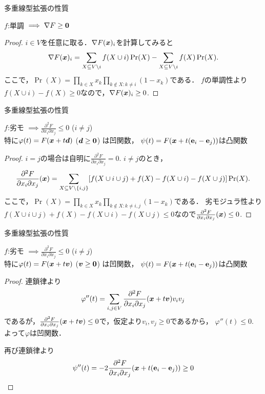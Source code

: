 \documentclass[14pt,aspectratio=169,xcolor=dvipsnames,table,onlytextwidth,dvipdfmx]{beamer}
\begin{document}
\begin{frame}[t]{多重線型拡張の性質}
    \small
    \begin{lemma}
        $f$:単調 $\implies \nabla F \geq \mathbf{0}$
    \end{lemma}
    \begin{proof}
        $i \in V$を任意に取る．$\nabla F(\boldsymbol{x})_i$を計算してみると
        \[
            \nabla F(\boldsymbol{x})_i = \sum_{X \subseteq V \setminus i} f(X \cup i)\Pr(X) - \sum_{X \subseteq V \setminus i} f(X)\Pr(X).
        \]
        ここで，$\Pr(X) = \prod_{k \in X}x_k \prod_{k \notin X: k \neq i} (1 - x_k)$である．
        $f$の単調性より$f(X \cup i) - f(X) \geq 0$なので，$\nabla F(\boldsymbol{x})_i \geq 0$.
    \end{proof}
\end{frame}

\begin{frame}[t]{多重線型拡張の性質}
    \small
    \begin{lemma}
        $f$:劣モ $\implies \frac{\partial^2 F}{\partial x_i \partial x_j} \leq 0$ ($i \neq j$) \\
        特に$\varphi(t) = F(\boldsymbol{x} + t \boldsymbol{d})$ ($\boldsymbol{d}\geq \mathbf{0}$) は凹関数，
        $\psi(t) = F(\boldsymbol{x} + t(\mathbf{e}_i - \mathbf{e}_j))$は凸関数
    \end{lemma}
    \begin{proof}
        $i = j$の場合は自明に$\frac{\partial^2 F}{\partial x_i \partial x_j} = 0$. $i\neq j$のとき，
        \[
            \frac{\partial^2 F}{\partial x_i \partial x_j}(\boldsymbol{x}) =
            \sum_{X \subseteq V\setminus\{i, j\}}
            [f(X \cup i \cup j) + f(X) - f(X \cup i) - f(X \cup j)]\Pr(X).
        \]
        ここで，$\Pr(X) = \prod_{k \in X}x_k \prod_{k \notin X: k \neq i, j} (1 - x_k)$である．
        劣モジュラ性より$f(X \cup i \cup j) + f(X) - f(X \cup i) - f(X \cup j) \leq 0$なので$\frac{\partial^2 F}{\partial x_i \partial x_j}(\boldsymbol{x})\leq 0$.
    \end{proof}
\end{frame}

\begin{frame}[t]{多重線型拡張の性質}
    \small
    \begin{lemma}
        $f$:劣モ $\implies \frac{\partial^2 F}{\partial x_i \partial x_j} \leq 0$ ($i \neq j$) \\
        特に$\varphi(t) = F(\boldsymbol{x} + t \boldsymbol{v})$ ($\boldsymbol{v} \geq \mathbf{0}$) は凹関数，
        $\psi(t) = F(\boldsymbol{x} + t(\mathbf{e}_i - \mathbf{e}_j))$は凸関数
    \end{lemma}
    \begin{proof}
    連鎖律より
    \[
        \varphi''(t) = \sum_{i, j \in V} \frac{\partial^2 F}{\partial x_i \partial x_j}(\boldsymbol{x}+t\boldsymbol{v}) v_iv_j
    \]
    であるが，$\frac{\partial^2 F}{\partial x_i \partial x_j}(\boldsymbol{x}+t\boldsymbol{v}) \leq 0$で，仮定より$v_i, v_j \geq 0$であるから，
    $\varphi''(t) \leq 0$.
    よって$\varphi$は凹関数．

    \pause
    \bigskip
    再び連鎖律より
    \[
        \psi''(t) = -2\frac{\partial^2 F}{\partial x_i \partial x_j}(\boldsymbol{x}+t(\mathbf{e}_i-\mathbf{e}_j)) \geq 0
    \]
    \end{proof}
\end{frame}
\end{document}

